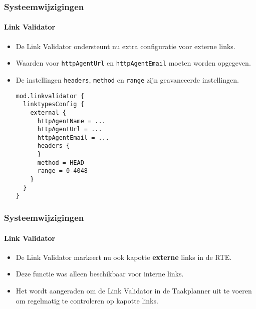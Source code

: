 
\begin{frame}[fragile]
	\frametitle{Systeemwijzigingen}
	\framesubtitle{Link Validator}

	\lstset{basicstyle=\tiny\ttfamily}

	\begin{itemize}
		\item De Link Validator ondersteunt nu extra configuratie voor externe links.
		\item Waarden voor \texttt{httpAgentUrl} en \texttt{httpAgentEmail} moeten worden opgegeven.
		\item De instellingen \texttt{headers}, \texttt{method} en \texttt{range} zijn geavanceerde instellingen.
\begin{lstlisting}
mod.linkvalidator {
  linktypesConfig {
    external {
      httpAgentName = ...
      httpAgentUrl = ...
      httpAgentEmail = ...
      headers {
      }
      method = HEAD
      range = 0-4048
    }
  }
}
\end{lstlisting}

	\end{itemize}

\end{frame}


\begin{frame}[fragile]
	\frametitle{Systeemwijzigingen}
	\framesubtitle{Link Validator}

	\begin{itemize}
		\item De Link Validator markeert nu ook kapotte \textbf{externe} links in de RTE.
		\item Deze functie was alleen beschikbaar voor interne links.
		\item Het wordt aangeraden om de Link Validator in de Taakplanner uit te voeren om regelmatig te controleren op kapotte links.
	\end{itemize}

\end{frame}




